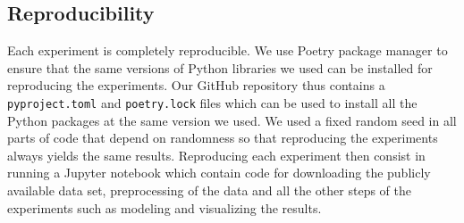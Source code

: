 





\subsection{Reproducibility}

Each experiment is completely reproducible.
We use Poetry package manager \cite{poetry} to ensure that the same versions of Python libraries we used can be installed for reproducing the experiments.
Our GitHub repository thus contains a \texttt{pyproject.toml} and \texttt{poetry.lock} files which can be used to install all the Python packages at the same version we used.
We used a fixed random seed in all parts of code that depend on randomness so that reproducing the experiments always yields the same results.
Reproducing each experiment then consist in running a Jupyter notebook which contain code for downloading the publicly available data set, preprocessing of the data and all the other steps of the experiments such as modeling and visualizing the results.